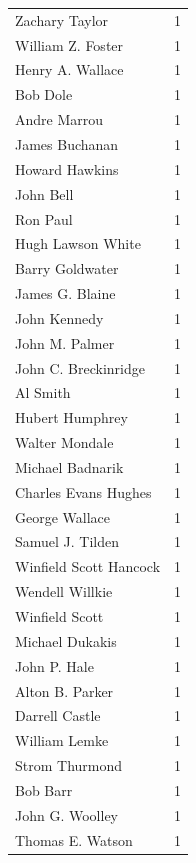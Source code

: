 \documentclass[
  letterpaper,
  DIV=11,
  numbers=noendperiod]{scrreprt}
\begin{document}
\begin{tabular}{lr}
Zachary Taylor         &          1 \\
William Z. Foster      &          1 \\
Henry A. Wallace       &          1 \\
Bob Dole               &          1 \\
Andre Marrou           &          1 \\
James Buchanan         &          1 \\
Howard Hawkins         &          1 \\
John Bell              &          1 \\
Ron Paul               &          1 \\
Hugh Lawson White      &          1 \\
Barry Goldwater        &          1 \\
James G. Blaine        &          1 \\
John Kennedy           &          1 \\
John M. Palmer         &          1 \\
John C. Breckinridge   &          1 \\
Al Smith               &          1 \\
Hubert Humphrey        &          1 \\
Walter Mondale         &          1 \\
Michael Badnarik       &          1 \\
Charles Evans Hughes   &          1 \\
George Wallace         &          1 \\
Samuel J. Tilden       &          1 \\
Winfield Scott Hancock &          1 \\
Wendell Willkie        &          1 \\
Winfield Scott         &          1 \\
Michael Dukakis        &          1 \\
John P. Hale           &          1 \\
Alton B. Parker        &          1 \\
Darrell Castle         &          1 \\
William Lemke          &          1 \\
Strom Thurmond         &          1 \\
Bob Barr               &          1 \\
John G. Woolley        &          1 \\
Thomas E. Watson       &          1 \\
\bottomrule
\end{tabular}
\end{document}
